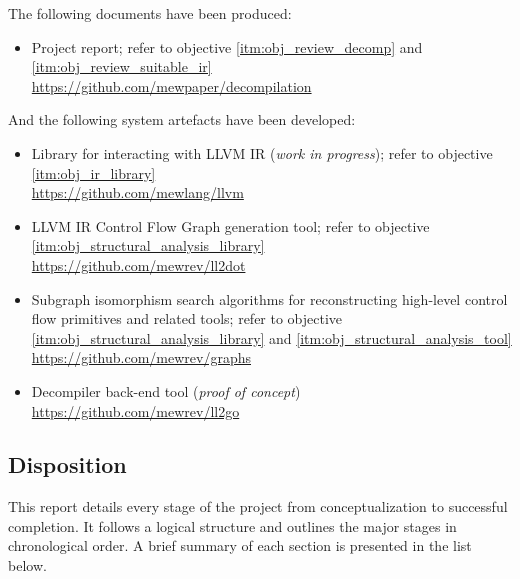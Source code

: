 The following documents have been produced:
\begin{itemize}
	\item Project report; refer to objective \ref{itm:obj_review_decomp} and \ref{itm:obj_review_suitable_ir} \\ \url{https://github.com/mewpaper/decompilation}
\end{itemize}

And the following system artefacts have been developed:
\begin{itemize}
	\item Library for interacting with LLVM IR (\textit{work in progress}); refer to objective \ref{itm:obj_ir_library} \\ \url{https://github.com/mewlang/llvm}
	\item LLVM IR Control Flow Graph generation tool; refer to objective \ref{itm:obj_structural_analysis_library} \\ \url{https://github.com/mewrev/ll2dot}
	\item Subgraph isomorphism search algorithms for reconstructing high-level control flow primitives and related tools; refer to objective \ref{itm:obj_structural_analysis_library} and \ref{itm:obj_structural_analysis_tool} \\ \url{https://github.com/mewrev/graphs}
	\item Decompiler back-end tool (\textit{proof of concept}) \\ \url{https://github.com/mewrev/ll2go}
\end{itemize}


\subsection{Disposition}

This report details every stage of the project from conceptualization to successful completion. It follows a logical structure and outlines the major stages in chronological order. A brief summary of each section is presented in the list below.

